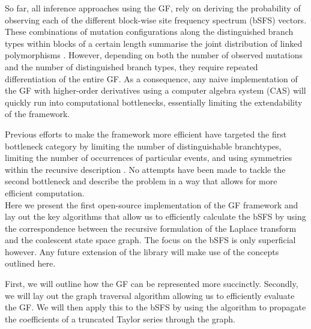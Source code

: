 \documentclass[10pt, a4]{article}
\begin{document}
So far, all inference approaches using the GF, rely on deriving the probability of observing each of the different block-wise site frequency spectrum (bSFS) vectors. These combinations of mutation configurations along the distinguished branch types within blocks of a certain length summarise the joint distribution of linked polymorphisms \citep{Bunnefeld2015}. However, depending on both the number of observed mutations and the number of distinguished branch types, they require repeated differentiation of the entire GF. As a consequence, any naive implementation of the GF with higher-order derivatives using a computer algebra system (CAS) will quickly run into computational bottlenecks, essentially limiting the extendability of the framework.

Previous efforts to make the framework more efficient have targeted the first bottleneck category by limiting the number of distinguishable branchtypes, limiting the number of occurrences of particular events, and using symmetries within the recursive description \citep{Lohse2016}. No attempts have been made to tackle the second bottleneck and describe the problem in a way that allows for more efficient computation.\\

Here we present the first open-source implementation of the GF framework and lay out the key algorithms that allow us to efficiently calculate the bSFS by using the correspondence between the recursive formulation of the Laplace transform and the coalescent state space graph. The focus on the bSFS is only superficial however. Any future extension of the library will make use of the concepts outlined here.

First, we will outline how the GF can be represented more succinctly. Secondly, we will lay out the graph traversal algorithm allowing us to efficiently evaluate the GF. We will then apply this to the bSFS by using the algorithm to propagate the coefficients of a truncated Taylor series through the graph. %
\end{document}
